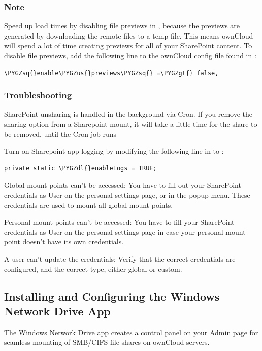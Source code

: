 \documentclass[letterpaper,10pt,english]{sphinxmanual}
\def\PYGZus{\char`\_}
\def\PYGZgt{\char`\>}
\def\PYGZdl{\char`\$}
\def\PYGZsq{\char`\'}
\begin{document}
\subsubsection{Note}
\label{enterprise_external_storage/sharepoint-integration_configuration:note}
Speed up load times by disabling file previews in , because the
previews are generated by downloading the remote files to a temp file. This
means ownCloud will spend a lot of time creating previews for all of your
SharePoint content. To disable file previews, add the following line to the
ownCloud config file found in :

\begin{Verbatim}[commandchars=\\\{\}]
\PYGZsq{}enable\PYGZus{}previews\PYGZsq{} =\PYGZgt{} false,
\end{Verbatim}


\subsubsection{Troubleshooting}
\label{enterprise_external_storage/sharepoint-integration_configuration:troubleshooting}
SharePoint unsharing is handled in the background via Cron. If you remove the
sharing option from a Sharepoint mount, it will take a little time for the
share to be removed, until the Cron job runs

Turn on Sharepoint app logging by modifying the following line in
 to :

\begin{Verbatim}[commandchars=\\\{\}]
private static \PYGZdl{}enableLogs = TRUE;
\end{Verbatim}

Global mount points can't be accessed: You have to fill out your SharePoint
credentials as User on the personal settings page, or in the popup menu. These
credentials are used to mount all global mount points.

Personal mount points can't be accessed: You have to fill your SharePoint
credentials as User on the personal settings page in case your personal mount
point doesn't have its own credentials.

A user can't update the credentials: Verify that the correct credentials are
configured, and the correct type, either global or custom.


\subsection{Installing and Configuring the Windows Network Drive App}
\label{enterprise_external_storage/windows-network-drive_configuration::doc}\label{enterprise_external_storage/windows-network-drive_configuration:installing-and-configuring-the-windows-network-drive-app}
The Windows Network Drive app creates a control panel on your Admin page for
seamless mounting of SMB/CIFS file shares on ownCloud servers.
\end{document}
